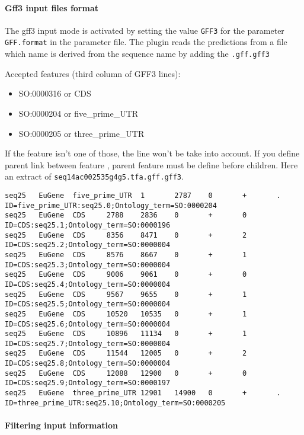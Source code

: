 \paragraph{Gff3 input files format}

The gff3 input mode is activated by setting the value \texttt{GFF3}
for the parameter \texttt{GFF.format} in the parameter file.  The
plugin reads the predictions from a file which name is derived from
the sequence name by adding the \texttt{.gff.gff3}

Accepted features (third column of GFF3 lines):\\
\begin{itemize}
\item  SO:0000316 or CDS
\item  SO:0000204 or five\_prime\_UTR
\item  SO:0000205 or three\_prime\_UTR
\end{itemize}

If the feature isn't one of those, the line won't be take into
account.  If you define parent link between feature , parent feature
must be define before children.  Here an extract of \texttt{seq14ac002535g4g5.tfa.gff.gff3}.
\begin{Verbatim}[fontsize=\tiny]
seq25   EuGene  five_prime_UTR  1       2787    0       +       .       ID=five_prime_UTR:seq25.0;Ontology_term=SO:0000204
seq25   EuGene  CDS     2788    2836    0       +       0       ID=CDS:seq25.1;Ontology_term=SO:0000196
seq25   EuGene  CDS     8356    8471    0       +       2       ID=CDS:seq25.2;Ontology_term=SO:0000004
seq25   EuGene  CDS     8576    8667    0       +       1       ID=CDS:seq25.3;Ontology_term=SO:0000004
seq25   EuGene  CDS     9006    9061    0       +       0       ID=CDS:seq25.4;Ontology_term=SO:0000004
seq25   EuGene  CDS     9567    9655    0       +       1       ID=CDS:seq25.5;Ontology_term=SO:0000004
seq25   EuGene  CDS     10520   10535   0       +       1       ID=CDS:seq25.6;Ontology_term=SO:0000004
seq25   EuGene  CDS     10896   11134   0       +       1       ID=CDS:seq25.7;Ontology_term=SO:0000004
seq25   EuGene  CDS     11544   12005   0       +       2       ID=CDS:seq25.8;Ontology_term=SO:0000004
seq25   EuGene  CDS     12088   12900   0       +       0       ID=CDS:seq25.9;Ontology_term=SO:0000197
seq25   EuGene  three_prime_UTR 12901   14900   0       +       .       ID=three_prime_UTR:seq25.10;Ontology_term=SO:0000205
\end{Verbatim}


\paragraph{Filtering input information}

